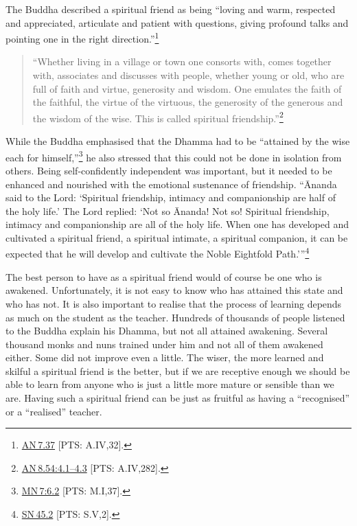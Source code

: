 \documentclass[10pt, openright]{book}
\begin{document}
The Buddha described a spiritual friend as being “loving and warm, respected and appreciated, articulate and patient with questions, giving profound talks and pointing one in the right direction.”\footnote {\href{https://suttacentral.net/an7.37/en/sujato}{AN 7.37} [PTS: A.IV,32].}


\begin{quote}


“Whether living in a village or town one consorts with, comes together with, associates and discusses with people, whether young or old, who are full of faith and virtue, generosity and wisdom. One emulates the faith of the faithful, the virtue of the virtuous, the generosity of the generous and the wisdom of the wise. This is called spiritual friendship.”\footnote {\href{https://suttacentral.net/an8.54/en/sujato\#4.1}{AN 8.54:4.1–4.3} [PTS: A.IV,282].}




\end{quote}
While the Buddha emphasised that the Dhamma had to be “attained by the wise each for himself,”\footnote {\href{https://suttacentral.net/mn7/en/sujato\#6.2}{MN 7:6.2} [PTS: M.I,37].} he also stressed that this could not be done in isolation from others. Being self-confidently independent was important, but it needed to be enhanced and nourished with the emotional sustenance of friendship. “Ānanda said to the Lord: ‘Spiritual friendship, intimacy and companionship are half of the holy life.’ The Lord replied: ‘Not so Ānanda! Not so! Spiritual friendship, intimacy and companionship are all of the holy life. When one has developed and cultivated a spiritual friend, a spiritual intimate, a spiritual companion, it can be expected that he will develop and cultivate the Noble Eightfold Path.’”\footnote {\href{https://suttacentral.net/sn45.2/en/sujato}{SN 45.2} [PTS: S.V,2].}


The best person to have as a spiritual friend would of course be one who is awakened. Unfortunately, it is not easy to know who has attained this state and who has not. It is also important to realise that the process of learning depends as much on the student as the teacher. Hundreds of thousands of people listened to the Buddha explain his Dhamma, but not all attained awakening. Several thousand monks and nuns trained under him and not all of them awakened either. Some did not improve even a little. The wiser, the more learned and skilful a spiritual friend is the better, but if we are receptive enough we should be able to learn from anyone who is just a little more mature or sensible than we are. Having such a spiritual friend can be just as fruitful as having a “recognised” or a “realised” teacher.
\end{document}
